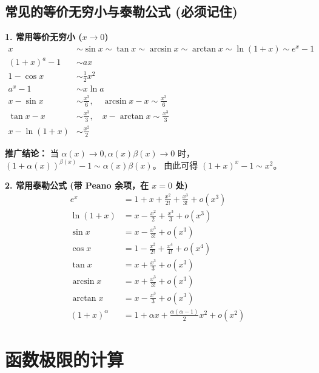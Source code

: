 \documentclass[a4paper,12pt]{ctexart}
\newenvironment{rednote}
  {\begin{tcolorbox}[colback=notepurple, colframe=highlightred, boxrule=1pt, title=\textbf{重点/技巧/手写笔记}]}
  {\end{tcolorbox}}
\begin{document}
\subsection{常见的等价无穷小与泰勒公式 (必须记住)}

\textbf{1. 常用等价无穷小 ($x \to 0$)}
\begin{align*}
    x &\sim \sin x \sim \tan x \sim \arcsin x \sim \arctan x \sim \ln(1+x) \sim e^x - 1 \\
    (1+x)^a - 1 &\sim ax \\
    1 - \cos x &\sim \frac{1}{2}x^2 \\
    a^x - 1 &\sim x \ln a \\
    x - \sin x &\sim \frac{x^3}{6}, \quad \arcsin x - x \sim \frac{x^3}{6} \\
    \tan x - x &\sim \frac{x^3}{3}, \quad x - \arctan x \sim \frac{x^3}{3} \\
    x - \ln(1+x) &\sim \frac{x^2}{2}
\end{align*}

\begin{rednote}
    \textbf{推广结论：}
    当 $\alpha(x) \to 0, \alpha(x)\beta(x) \to 0$ 时，$(1+\alpha(x))^{\beta(x)} - 1 \sim \alpha(x)\beta(x)$。
    由此可得 $(1+x)^x - 1 \sim x^2$。
\end{rednote}

\textbf{2. 常用泰勒公式 (带 Peano 余项，在 $x=0$ 处)}
\begin{align*}
    e^x &= 1 + x + \frac{x^2}{2!} + \frac{x^3}{3!} + o(x^3) \\
    \ln(1+x) &= x - \frac{x^2}{2} + \frac{x^3}{3} + o(x^3) \\
    \sin x &= x - \frac{x^3}{3!} + o(x^3) \\
    \cos x &= 1 - \frac{x^2}{2!} + \frac{x^4}{4!} + o(x^4) \\
    \tan x &= x + \frac{x^3}{3} + o(x^3) \\
    \arcsin x &= x + \frac{x^3}{3!} + o(x^3) \\
    \arctan x &= x - \frac{x^3}{3} + o(x^3) \\
    (1+x)^\alpha &= 1 + \alpha x + \frac{\alpha(\alpha-1)}{2}x^2 + o(x^2)
\end{align*}

\section{函数极限的计算}
\end{document}
